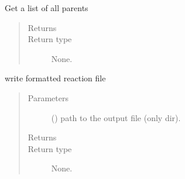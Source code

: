 \documentclass[letterpaper,10pt,english]{sphinxmanual}
\begin{document}
\begin{fulllineitems}
\begin{fulllineitems}
\begin{quote}
\begin{description}
\end{description}\end{quote}

\end{fulllineitems}


\begin{fulllineitems}
\label{\detokenize{api/inputgeneration:parsersD1S.ReactionFile.get_parents}}
Get a list of all parents
\begin{quote}\begin{description}
\item[{Returns}] \leavevmode


\item[{Return type}] \leavevmode
None.

\end{description}\end{quote}

\end{fulllineitems}


\begin{fulllineitems}
\label{\detokenize{api/inputgeneration:parsersD1S.ReactionFile.write}}
write formatted reaction file
\begin{quote}\begin{description}
\item[{Parameters}] \leavevmode
{} () \textendash{} path to the output file (only dir).

\item[{Returns}] \leavevmode


\item[{Return type}] \leavevmode
None.

\end{description}\end{quote}

\end{fulllineitems}


\end{fulllineitems}
\end{document}
